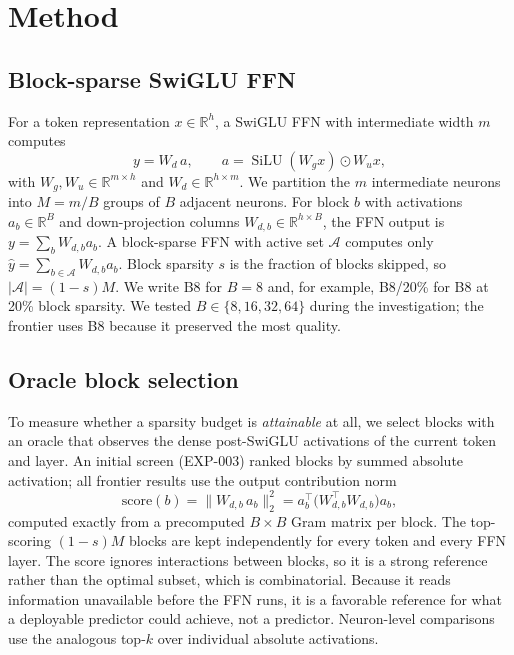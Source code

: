 \section{Method}

\subsection{Block-sparse SwiGLU FFN}

For a token representation $x\in\mathbb{R}^{h}$, a SwiGLU FFN with
intermediate width $m$ computes
\begin{equation}
y=W_d\,a,\qquad a=\operatorname{SiLU}(W_gx)\odot W_ux,
\end{equation}
with $W_g,W_u\in\mathbb{R}^{m\times h}$ and $W_d\in\mathbb{R}^{h\times m}$. We
partition the $m$ intermediate neurons into $M=m/B$ groups of $B$ adjacent
neurons. For block $b$ with activations $a_b\in\mathbb{R}^{B}$ and
down-projection columns $W_{d,b}\in\mathbb{R}^{h\times B}$, the FFN output is
$y=\sum_b W_{d,b}a_b$. A block-sparse FFN with active set $\mathcal{A}$ computes
only $\hat y=\sum_{b\in\mathcal{A}}W_{d,b}a_b$. Block sparsity $s$ is the
fraction of blocks skipped, so $|\mathcal{A}|=(1-s)M$. We write B8 for $B=8$
and, for example, B8/20\% for B8 at 20\% block sparsity. We tested
$B\in\{8,16,32,64\}$ during the investigation; the frontier uses B8 because it
preserved the most quality.

\subsection{Oracle block selection}

To measure whether a sparsity budget is \emph{attainable} at all, we select
blocks with an oracle that observes the dense post-SwiGLU activations of the
current token and layer. An initial screen (EXP-003) ranked blocks by summed
absolute activation; all frontier results use the output contribution norm
\begin{equation}
\text{score}(b)=\lVert W_{d,b}\,a_b\rVert_2^2 = a_b^{\top}\bigl(W_{d,b}^{\top}W_{d,b}\bigr)a_b,
\end{equation}
computed exactly from a precomputed $B\times B$ Gram matrix per block. The
top-scoring $(1-s)M$ blocks are kept independently for every token and every
FFN layer. The score ignores interactions between blocks, so it is a strong
reference rather than the optimal subset, which is combinatorial. Because it
reads information unavailable before the FFN runs, it is a favorable
reference for what a deployable predictor could achieve, not a predictor.
Neuron-level comparisons use the analogous top-$k$ over individual absolute
activations.

